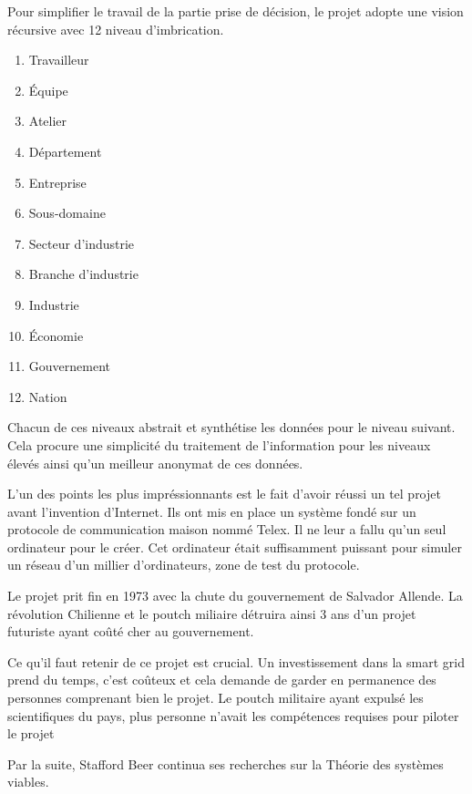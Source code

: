 Pour simplifier le travail de la partie prise de décision, le projet adopte une vision récursive avec
12 niveau d'imbrication.

\begin{enumerate}
  \item Travailleur
  \item Équipe
  \item Atelier
  \item Département
  \item Entreprise
  \item Sous-domaine
  \item Secteur d'industrie
  \item Branche d'industrie
  \item Industrie
  \item Économie
  \item Gouvernement
  \item Nation
\end{enumerate}

Chacun de ces niveaux abstrait et synthétise les données pour le niveau suivant.
Cela procure une simplicité du traitement de l'information pour les niveaux élevés
ainsi qu'un meilleur anonymat de ces données.

L'un des points les plus impréssionnants est le fait d'avoir réussi un tel projet avant
l'invention d'Internet. Ils ont mis en place un système fondé sur un protocole de communication maison nommé Telex.
Il ne leur a fallu qu'un seul ordinateur pour le créer. Cet ordinateur était suffisamment puissant pour
simuler un réseau d'un millier d'ordinateurs, zone de test du protocole.

Le projet prit fin en 1973 avec la chute du gouvernement de Salvador Allende.
La révolution Chilienne et le poutch miliaire détruira ainsi 3 ans d'un projet futuriste ayant
coûté cher au gouvernement.

Ce qu'il faut retenir de ce projet est crucial. Un investissement dans la smart grid prend du temps,
c'est coûteux et cela demande de garder en permanence des personnes comprenant bien le projet.
Le poutch militaire ayant expulsé les scientifiques du pays, plus personne n'avait les compétences
requises pour piloter le projet

Par la suite, Stafford Beer continua ses recherches sur la Théorie des systèmes viables.



